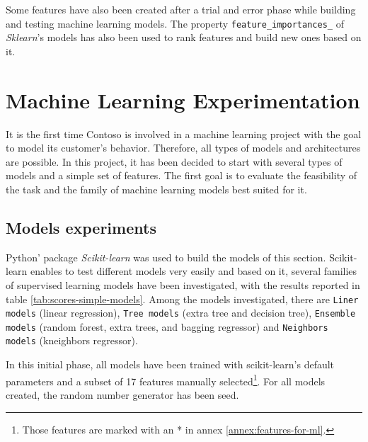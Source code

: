 Some features have also been created after a trial and error phase while building and testing machine learning models. The property \texttt{feature\_importances\_} of \textit{Sklearn}'s models has also been used to rank features and build new ones based on it.



\section{Machine Learning Experimentation} \label{sec:ml-experimentation}

It is the first time Contoso is involved in a machine learning project with the goal to model its customer's behavior. Therefore, all types of models and architectures are possible. In this project, it has been decided to start with several types of models and a simple set of features. The first goal is to evaluate the feasibility of the task and the family of machine learning models best suited for it. 


\subsection{Models experiments}
Python' package \textit{Scikit-learn} was used to build the models of this section. Scikit-learn enables to test different models very easily and based on it, several families of supervised learning models have been investigated, with the results reported in table \ref{tab:scores-simple-models}. Among the models investigated, there are \texttt{Liner models} (linear regression), \texttt{Tree models} (extra tree and decision tree), \texttt{Ensemble models} (random forest, extra trees, and bagging regressor) and \texttt{Neighbors models} (kneighbors regressor).

In this initial phase, all models have been trained with scikit-learn's default parameters and a subset of 17 features manually selected\footnote{Those features are marked with an * in annex \ref{annex:features-for-ml}.}. For all models created, the random number generator has been seed.

